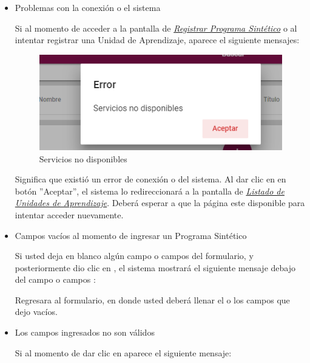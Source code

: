     \begin{itemize}
        \item Problemas con la conexión o el sistema

        Si al momento de acceder a la pantalla de \hyperlink{registrarPS}{\textit{Registrar Programa Sintético}} o al intentar registrar una Unidad de Aprendizaje, aparece el siguiente mensajes:

        \begin{figure}[H]
            \centering
            \includegraphics[width=0.4\linewidth]{images/SP6/MSGSN.png}
            \caption{Servicios no disponibles}
            \label{SND}

        \end{figure}

        Significa que existió un error de conexión o del sistema. Al dar clic en en botón ''Aceptar'', el sistema lo redireccionará a la pantalla de \hyperlink{verTareas}{\textit{Listado de Unidades de Aprendizaje}}. Deberá esperar a que la página este disponible para  intentar acceder nuevamente.

        \item Campos vacíos al momento de ingresar un Programa Sintético

        Si usted deja en blanco algún campo o campos del formulario, y posteriormente dio clic en , el sistema mostrará el siguiente mensaje debajo del campo o campos :


       Regresara al formulario, en donde usted deberá llenar el o los campos que dejo vacíos.

       \item Los campos ingresados no son válidos

       Si al momento de dar clic en  aparece el siguiente mensaje:


\end{itemize}
